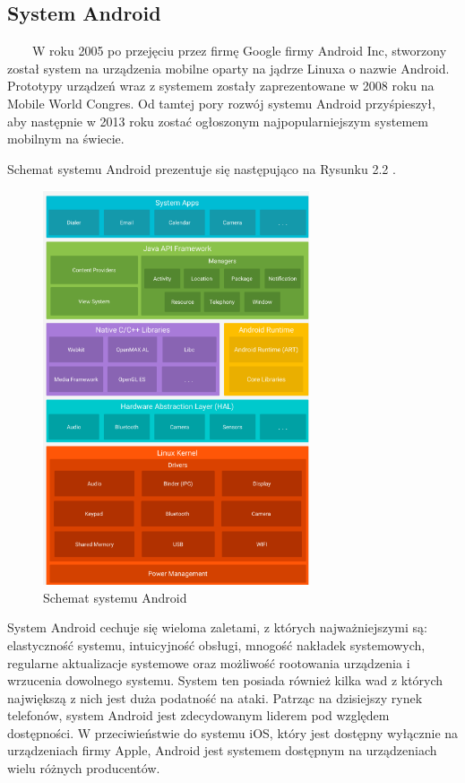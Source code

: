 \documentclass[a4paper,12pt,oneside]{book}
\begin{document}
	\subsection{System Android}
	\ \ \ \
	W roku 2005 po przejęciu przez firmę Google firmy Android Inc, stworzony został system na urządzenia mobilne oparty na jądrze Linuxa o nazwie Android. Prototypy urządzeń wraz z systemem zostały zaprezentowane w 2008 roku na Mobile World Congres. Od tamtej pory rozwój systemu Android przyśpieszył, aby następnie w 2013 roku zostać ogłoszonym najpopularniejszym systemem mobilnym na świecie.
	
	\newpage
	Schemat systemu Android prezentuje się następująco na Rysunku 2.2 \cite{ref11} .
	
	\begin{figure}[h]
		\centering
		\includegraphics[width=0.70\textwidth]{grafika/schemat_android.png}
		\caption{Schemat systemu Android}
	\end{figure}
	
	System Android cechuje się wieloma zaletami, z których najważniejszymi są: elastyczność systemu, intuicyjność obsługi, mnogość nakładek systemowych, regularne aktualizacje systemowe oraz możliwość rootowania urządzenia i wrzucenia dowolnego systemu. System ten posiada również kilka wad z których największą z nich jest duża podatność na ataki. Patrząc na dzisiejszy rynek telefonów, system Android jest zdecydowanym liderem pod względem dostępności. W przeciwieństwie do systemu iOS, który jest dostępny wyłącznie na urządzeniach firmy Apple, Android jest systemem dostępnym na urządzeniach wielu różnych producentów.
	
\end{document}
